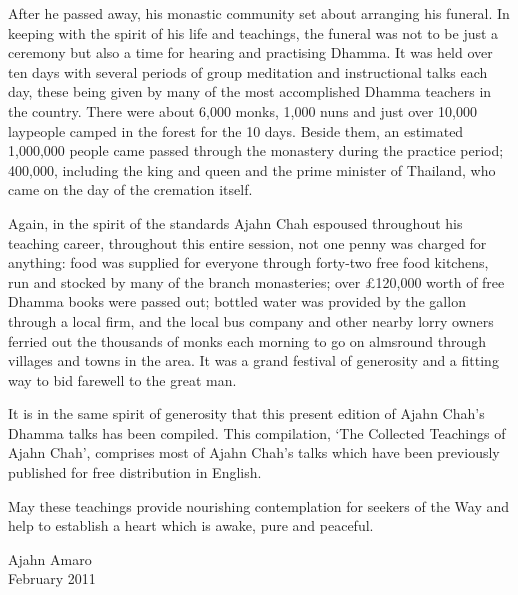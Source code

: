 After he passed away, his monastic community set about arranging his funeral. In keeping with the spirit of his life and teachings, the funeral was not to be just a ceremony but also a time for hearing and practising Dhamma. It was held over ten days with several periods of group meditation and instructional talks each day, these being given by many of the most accomplished Dhamma teachers in the country. There were about 6,000 monks, 1,000 nuns and just over 10,000 laypeople camped in the forest for the 10 days. Beside them, an estimated 1,000,000 people came passed through the monastery during the practice period; 400,000, including the king and queen and the prime minister of Thailand, who came on the day of the cremation itself.

Again, in the spirit of the standards Ajahn Chah espoused throughout his teaching career, throughout this entire session, not one penny was charged for anything: food was supplied for everyone through forty-two free food kitchens, run and stocked by many of the branch monasteries; over \pounds 120,000 worth of free Dhamma books were passed out; bottled water was provided by the gallon through a local firm, and the local bus company and other nearby lorry owners ferried out the thousands of monks each morning to go on almsround through villages and towns in the area. It was a grand festival of generosity and a fitting way to bid farewell to the great man.

It is in the same spirit of generosity that this present edition of Ajahn Chah's Dhamma talks has been compiled. This compilation, `The Collected Teachings of Ajahn Chah', comprises most of Ajahn Chah's talks which have been previously published for free distribution in English.

May these teachings provide nourishing contemplation for seekers of the Way and help to establish a heart which is awake, pure and peaceful.
\vspace*{2\baselineskip}

{\raggedleft\par Ajahn Amaro\\
February 2011 \par}
